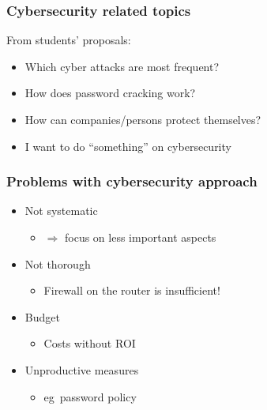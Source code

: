 \documentclass[aspectratio=169]{beamer}
\begin{document}
\begin{frame}
    \frametitle{Cybersecurity related topics}
    
    From students' proposals: 
    
    \begin{itemize}
        \item Which cyber attacks are most frequent?
        \item How does password cracking work?
        \item How can companies/persons protect themselves?
        \item I want to do ``something'' on cybersecurity
    \end{itemize}
    
    \bigskip
    
    
\end{frame}

\begin{frame}
    \frametitle{Problems with cybersecurity approach}
    
    \begin{itemize}
       \item Not systematic
       \begin{itemize}
           \item $\Rightarrow$ focus on less important aspects
       \end{itemize}
       \item Not thorough
       \begin{itemize}
           \item Firewall on the router is insufficient!
       \end{itemize}
       \item Budget
       \begin{itemize}
           \item Costs without ROI
       \end{itemize}
       \item Unproductive measures
       \begin{itemize}
           \item eg\ password policy
       \end{itemize}
   \end{itemize}
    
\end{frame}
\end{document}
